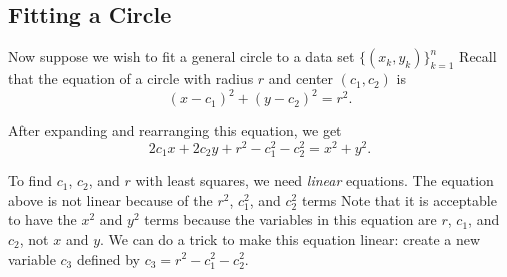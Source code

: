 \subsection*{Fitting a Circle} %

Now suppose we wish to fit a general circle to a data set $\{(x_k, y_k)\}_{k=1}^n$
Recall that the equation of a circle with radius $r$ and center $(c_1,c_2)$ is
\begin{equation}
\label{circle}
(x-c_1)^2 + (y-c_2)^2 = r^2.
\end{equation}

After expanding and rearranging this equation, we get
\begin{equation*}
\label{circle2}
2c_1x + 2c_2y + r^2 - c_1^2 - c_2^2 = x^2 + y^2.
\end{equation*}

To find $c_1$, $c_2$, and $r$ with least squares, we need \emph{linear} equations.
The equation above is not linear because of the $r^2$, $c_1^2$, and $c_2^2$ terms
Note that it is acceptable to have the $x^2$ and $y^2$ terms because the variables in this equation are $r$, $c_1$, and $c_2$, not $x$ and $y$.
We can do a trick to make this equation linear: create a new variable $c_3$ defined by $c_3 = r^2-c_1^2-c_2^2$.


